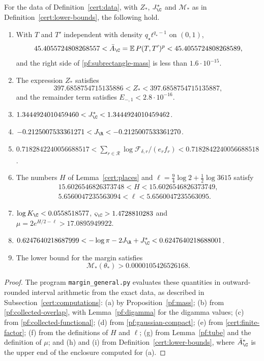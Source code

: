 \begin{proposition}\label{cert:enclosures}
For the data of Definition~\ref{cert:data}, with $Z_*$, $J_\C^*$ and
$\mathcal M_*$ as in Definition~\ref{cert:lower-bounds}, the following
hold.
\begin{enumerate}
\item[(a)] With $T$ and $T'$ independent with density $q_\star t^{q_\star-1}$ on
$(0,1)$,
\begin{equation}\label{cert:mass}
 45.4055724808268557<\bar A_\C=\mathbb E\,P(T,T')^p<45.4055724808268589 ,
\end{equation}
and the right side of \eqref{pf:subrectangle-mass} is less than
$1.6\cdot10^{-15}$.
\item[(b)] The expression $Z_*$ satisfies
\begin{equation}\label{cert:overlap}
 397.6858754715135886<Z_*<397.6858754715135887 ,
\end{equation}
and the remainder term satisfies $E_{-,1}<2.8\cdot10^{-16}$.
\item[(c)] $1.3444924010459460<J_\C^*<1.3444924010459462$.
\item[(d)] $-0.2125007533361271<J_\R<-0.2125007533361270$.
\item[(e)] $0.7182842240056688517<\sum_{r\in\mathcal R}\log\mathcal
F_{\delta,r}/(e_rf_r)<0.7182842240056688518$.
\item[(f)] The numbers $H$ of Lemma~\ref{cert:places} and
$\ell=\frac94\log2+\frac12\log3615$ satisfy
\begin{gather*}
 15.6026546826373748<H<15.6026546826373749,\\
 5.6560047235563094<\ell<5.6560047235563095 .
\end{gather*}
\item[(g)] $\log K_\C<0.0558518577$, $\varsigma_\C>1.4728810283$ and
$\mu=2e^{H/2-\ell}>17.0895949922$.
\item[(h)] $0.6247640218687999<-\log\pi-2J_\R+J_\C^*<0.6247640218688001$.
\item[(i)] The lower bound for the margin satisfies
\begin{equation}\label{cert:margin}
 \mathcal M_*(\theta_*)>0.0000105426526168 .
\end{equation}
\end{enumerate}
\end{proposition}

\begin{proof}
The program \texttt{margin\_general.py} evaluates these quantities in
outward-rounded interval arithmetic from the exact data, as described in
Subsection~\ref{cert:computations}: (a) by Proposition~\ref{pf:mass}; (b)
from \eqref{pf:collected-overlap}, with Lemma~\ref{pf:digamma} for the
digamma values; (c) from \eqref{pf:collected-functional}; (d) from
\eqref{pf:gaussian-compact}; (e) from \eqref{cert:finite-factor}; (f) from
the definitions of $H$ and $\ell$; (g) from Lemma~\ref{pf:tube} and the
definition of $\mu$; and (h) and (i) from
Definition~\ref{cert:lower-bounds}, where $\bar A_\C^*$ is the upper end of
the enclosure computed for (a).
\end{proof}

